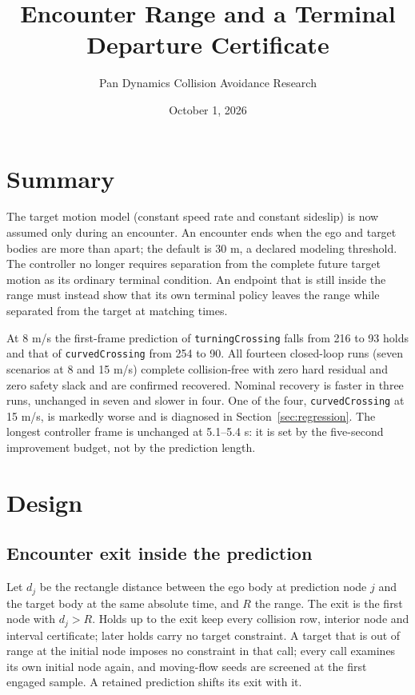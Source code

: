 \documentclass[11pt]{article}
\title{Encounter Range and a Terminal Departure Certificate}
\author{Pan Dynamics Collision Avoidance Research}
\date{October 1, 2026}
\begin{document}
\maketitle

\section{Summary}
The target motion model (constant speed rate and constant sideslip) is now
assumed only during an encounter. An encounter ends when the ego and target
bodies are more than  apart; the
default is 30 m, a declared modeling threshold. The controller no longer
requires separation from the complete future target motion as its ordinary
terminal condition. An endpoint that is still inside the range must instead
show that its own terminal policy leaves the range while separated from the
target at matching times.

At 8 m/s the first-frame prediction of \texttt{turningCrossing} falls from 216
to 93 holds and that of \texttt{curvedCrossing} from 254 to 90. All fourteen
closed-loop runs (seven scenarios at 8 and 15 m/s) complete collision-free
with zero hard residual and zero safety slack and are confirmed recovered.
Nominal recovery is faster in three runs, unchanged in seven and slower in
four. One of the four, \texttt{curvedCrossing} at 15 m/s, is markedly worse
and is diagnosed in Section~\ref{sec:regression}. The longest controller frame
is unchanged at 5.1--5.4 s: it is set by the five-second improvement budget,
not by the prediction length.

\section{Design}
\subsection{Encounter exit inside the prediction}
Let $d_j$ be the rectangle distance between the ego body at prediction node
$j$ and the target body at the same absolute time, and $R$ the range. The
exit is the first node with $d_j>R$. Holds up to the exit keep every collision
row, interior node and interval certificate; later holds carry no target
constraint. A target that is out of range at the initial node imposes no
constraint in that call; every call examines its own initial node again, and
moving-flow seeds are screened at the first engaged sample. A retained
prediction shifts its exit with it.
\end{document}
